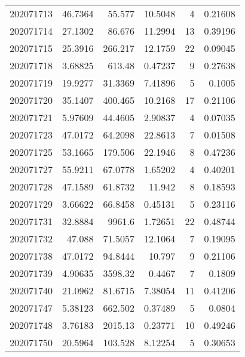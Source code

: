 \begin{tabular}{rrrrrr}
 202071713 &         46.7364  &       55.577  &           10.5048  &           4 & 0.21608 \\
 202071714 &         27.1302  &       86.676  &           11.2994  &          13 & 0.39196 \\
 202071715 &         25.3916  &      266.217  &           12.1759  &          22 & 0.09045 \\
 202071718 &          3.68825 &      613.48   &            0.47237 &           9 & 0.27638 \\
 202071719 &         19.9277  &       31.3369 &            7.41896 &           5 & 0.1005  \\
 202071720 &         35.1407  &      400.465  &           10.2168  &          17 & 0.21106 \\
 202071721 &          5.97609 &       44.4605 &            2.90837 &           4 & 0.07035 \\
 202071723 &         47.0172  &       64.2098 &           22.8613  &           7 & 0.01508 \\
 202071725 &         53.1665  &      179.506  &           22.1946  &           8 & 0.47236 \\
 202071727 &         55.9211  &       67.0778 &            1.65202 &           4 & 0.40201 \\
 202071728 &         47.1589  &       61.8732 &           11.942   &           8 & 0.18593 \\
 202071729 &          3.66622 &       66.8458 &            0.45131 &           5 & 0.23116 \\
 202071731 &         32.8884  &     9961.6    &            1.72651 &          22 & 0.48744 \\
 202071732 &         47.088   &       71.5057 &           12.1064  &           7 & 0.19095 \\
 202071738 &         47.0172  &       94.8444 &           10.797   &           9 & 0.21106 \\
 202071739 &          4.90635 &     3598.32   &            0.4467  &           7 & 0.1809  \\
 202071740 &         21.0962  &       81.6715 &            7.38054 &          11 & 0.41206 \\
 202071747 &          5.38123 &      662.502  &            0.37489 &           5 & 0.0804  \\
 202071748 &          3.76183 &     2015.13   &            0.23771 &          10 & 0.49246 \\
 202071750 &         20.5964  &      103.528  &            8.12254 &           5 & 0.30653 \\

\end{tabular}
